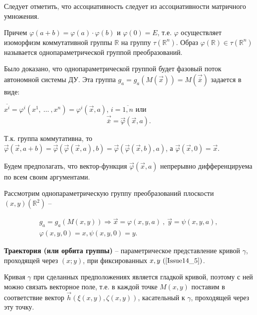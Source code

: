 Следует отметить, что ассоциативность следует из ассоциативности матричного умножения.

Причем $\varphi(a+b) = \varphi(a)\cdot \varphi(b)$ и $\varphi(0) = E$, т.е. $\varphi$ осуществляет изоморфизм коммутативной группы $\mathbb{R}$ на группу $\tau(\mathbb{R}^n)$. Образ $\varphi(\mathbb{R}) \in \tau(\mathbb{R}^n)$ называется однопараметрической группой преобразований.

Было доказано, что однопараметрической группой будет фазовый поток автономной системы ДУ. Эта группа $g_a = g_a(M(\vec{x})) = M(\vec{\overline{x}})$ задается в виде:

$\overline{x^i} = \varphi^i(x^1,\ \dots\ ,x^n) = \varphi^i(\vec{x}, a)$, $i = \overline{1, n}$ или 
\begin{equation}
	\vec{\overline{x}} = \vec{\varphi}(\vec{x}, a).
	\label{Issue14_4}
\end{equation}

Т.к. группа коммутативна, то $\vec{\varphi}(\vec{x}, a + b) = \vec{\varphi}(\vec{\varphi}(\vec{x}, a), b) = \vec{\varphi}(\vec{\varphi}(\vec{x}, b), a)$, а $\vec{\varphi}(\vec{x}, 0) = \vec{x}$.

Будем предполагать, что вектор-функция $\vec{\varphi}(\vec{x}, a)$ непрерывно дифференцируема по всем своим аргументами.

Рассмотрим однопараметрическую группу преобразований плоскости $(x,y)(\mathbb{R}^2)$ --

\begin{equation}
	\begin{gathered}
		g_a = g_a(M(x,y)) \Rightarrow \vec{x} = \varphi(x,y,a)\ ,\ \vec{y} = \psi(x,y,a),\\
		\varphi(x,y,0) = x, \psi(x,y,0) = y.
	\end{gathered}	
	\label{Issue14_5}
\end{equation}


\begin{definition}
	
	\textbf{Траектория (или орбита группы)} -- параметрическое представление кривой $\gamma$, проходящей через $(x;y)$, при фиксированных $x,y\ (\ref{Issue14_5})$.
	
\end{definition}


Кривая $\gamma$ при сделанных предположениях является $\textbf{гладкой кривой}$, поэтому с ней можно связать векторное поле, т.е. в каждой точке $M(x,y)$ поставим в соответствие вектор $\vec{h}(\xi(x,y), \zeta(x,y))$, касательный к $\gamma$, проходящей через эту точку.


